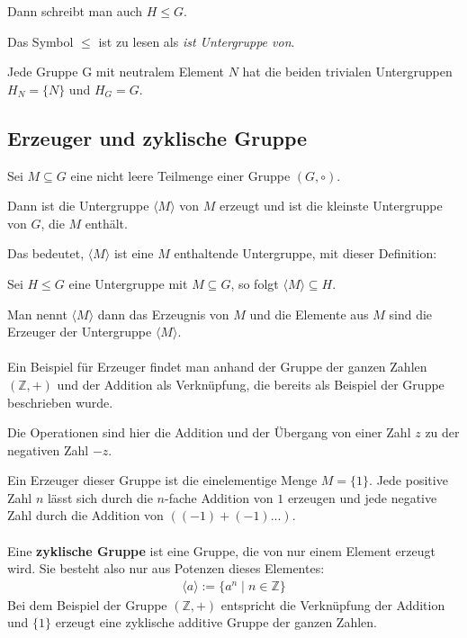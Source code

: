 \documentclass[12pt,a4paper, usenames, dvipsnames]{article}
\begin{document}
Dann schreibt man auch $H \leqslant G$. 



Das Symbol $\leqslant$ ist zu lesen als \textit{ist Untergruppe von}. 


Jede Gruppe G mit neutralem Element $N$ hat die beiden trivialen Untergruppen ${H_N = \{N\}}$ und $H_G=G$.
%
%
%
%
%
%
%
%
%
%

\subsection*{Erzeuger und zyklische Gruppe} 

Sei $M \subseteq G$ eine nicht leere Teilmenge einer Gruppe $(G, \circ)$. 

Dann ist die Untergruppe $\langle M \rangle$ von $M$ erzeugt und ist die kleinste Untergruppe von $G$, die $M$ enthält.

Das bedeutet, $\langle M \rangle$ ist eine $M$ enthaltende Untergruppe, mit dieser Definition:

Sei $H \leqslant G$ eine Untergruppe mit $M \subseteq G$, so folgt $\langle M \rangle \subseteq H$.

Man nennt $\langle M \rangle$ dann das Erzeugnis von $M$ und die Elemente aus $M$ sind die Erzeuger der Untergruppe $\langle M \rangle$.
\\
\\
Ein Beispiel für Erzeuger findet man anhand der Gruppe der ganzen Zahlen $(\mathbb{Z},+)$ und der Addition als Verknüpfung, die bereits als Beispiel der Gruppe beschrieben wurde.

Die Operationen sind hier die Addition und der Übergang von einer Zahl $z$ zu der negativen Zahl $-z$.

Ein Erzeuger dieser Gruppe ist die einelementige Menge $M = \{ 1 \}$. Jede positive Zahl $n$ lässt sich durch die $n$-fache Addition von $1$ erzeugen und jede negative Zahl durch  die Addition von $((-1)+(-1)...)$.
\\
\\
Eine \textbf{zyklische Gruppe} ist eine Gruppe, die von nur einem Element erzeugt wird. Sie besteht also nur aus Potenzen dieses Elementes: 
\begin{align*}
\langle a \rangle := \{ a^n \mid n \in \mathbb{Z} \}
\end{align*}
Bei dem Beispiel der Gruppe $(\mathbb{Z},+)$ entspricht die Verknüpfung der Addition und $\{ 1 \}$ erzeugt eine zyklische additive Gruppe der ganzen Zahlen.
%
%
%
%
%
%
%
%
%
%
\newpage
\end{document}
